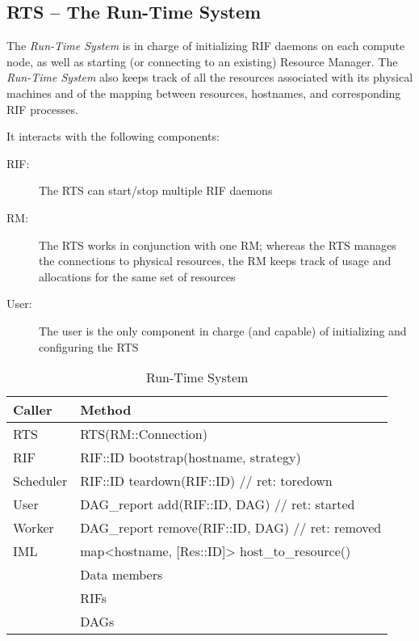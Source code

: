 \documentclass[10pt]{article}
\newcommand{\user}{User\xspace}
\newcommand{\rts}{RTS\xspace}
\newcommand{\sched}{Scheduler\xspace}
\newcommand{\worker}{Worker\xspace}
\newcommand{\rman}{RM\xspace}
\newcommand{\iml}{IML\xspace}
\newcommand{\rif}{RIF\xspace}
\newcommand{\rdag}{DAG\xspace}
\newcommand{\rdagrep}{DAG\_report\xspace}
\newcommand{\res}{Res\xspace}
\newcommand{\id}{::ID\xspace}
\newcommand{\conn}{::Connection\xspace}
\begin{document}
\subsection{RTS -- The Run-Time System}
The \emph{Run-Time System} is in charge of initializing RIF daemons on each
compute node, as well as starting (or connecting to an existing) Resource
Manager.
The \emph{Run-Time System} also keeps track of all the resources associated with
its physical machines and of the mapping between resources, hostnames, and
corresponding RIF processes.

It interacts with the following components:
\begin{description}
    \item [\rif:] The \rts can start/stop multiple \rif daemons
    \item [\rman:] The \rts works in conjunction with one \rman; whereas the
    \rts manages the connections to physical resources, the \rman keeps track of
    usage and allocations for the same set of resources  
    \item [\user:] The user is the only component in charge (and capable) of
    initializing and configuring the \rts
\end{description}
%
\begin{table}[ht]
    \centering
    \caption{Run-Time System}
    \label{tab:rts}
    \bgroup
    \setlength{\tabcolsep}{2em}
    \begin{tabular}{ll}
        \toprule
        Caller & Method \\
        \midrule
        \rts & \rts(\rman\conn) \\
        \rif & \rif\id bootstrap(hostname, strategy) \\
        \sched & \rif\id teardown(\rif\id)    // ret: toredown \\
        \user & \rdagrep add(\rif\id, \rdag) // ret: started \\
        \worker & \rdagrep remove(\rif\id, \rdag) // ret: removed \\
        \iml & map<hostname, [\res\id]> host\_to\_resource() \\
        \midrule
        & Data members \\        
        \midrule
        & RIFs \\
        & DAGs \\
        \bottomrule
    \end{tabular}
    \egroup
\end{table}
%
\end{document}

